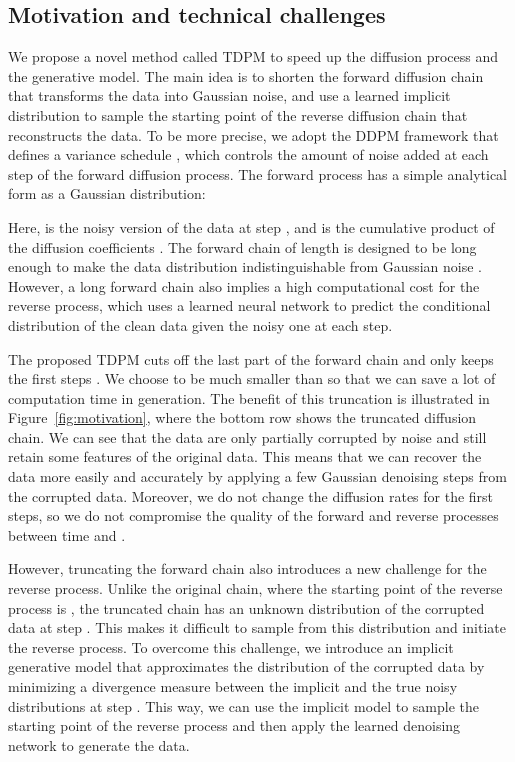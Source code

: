 \documentclass{article} \usepackage{iclr2023_conference,times}
\def\Figref#1{Figure~\ref{#1}}
\theoremstyle{plain}
\theoremstyle{definition}
\theoremstyle{remark}
\begin{document}
\subsection{Motivation and technical challenges}
{


{We propose a novel method called TDPM to speed up the diffusion process and the generative model. The main idea is to shorten the forward diffusion chain that transforms the data into Gaussian noise, and use a learned implicit distribution to sample the starting point of the reverse diffusion chain that reconstructs the data. 
To be more precise, we adopt the DDPM framework that defines a variance schedule , which controls the amount of noise added at each step of the forward diffusion process. The forward process has a simple analytical form as a Gaussian distribution:

Here,  is the noisy version of the data  at step , and  is the cumulative product of the diffusion coefficients . The forward chain of length  is designed to be long enough to make the data distribution indistinguishable from Gaussian noise . However, a long forward chain also implies a high computational cost for the reverse process, which uses a learned neural network to predict the conditional distribution of the clean data given the noisy one at each step. 
}

{
The proposed TDPM cuts off the last part of the forward chain and only keeps the first  steps . We choose  to be much smaller than  so that we can save a lot of computation time in generation. The benefit of this truncation is illustrated in \Figref{fig:motivation}, where the bottom row shows the truncated diffusion chain. We can see that the data are only partially corrupted by noise and still retain some features of the original data. This means that we can recover the data more easily and accurately by applying a few Gaussian denoising steps from the corrupted data. Moreover, we do not change the diffusion rates  for the first  steps, so we do not compromise the quality of the forward and reverse processes between time   and .

However, truncating the forward chain also introduces a new challenge for the reverse process. Unlike the original chain, where the starting point of the reverse process is 
,
the truncated chain has an unknown distribution of the corrupted data at step . This makes it difficult to sample from this distribution and initiate the reverse process. To overcome this challenge, we introduce an implicit generative model that approximates the distribution of the corrupted data by minimizing a divergence measure between the implicit and the true noisy distributions at step . This way, we can use the implicit model to sample the starting point of the reverse process and then apply the learned denoising network to generate the data.} 

}
\end{document}
